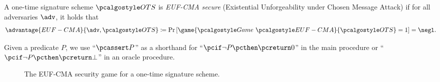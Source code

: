 \begin{definition}\label{def:euf-cma-ot}
    A one-time signature scheme $\algo{OTS}$ is \emph{EUF-CMA secure} (Existential Unforgeability under Chosen Message Attack) if for all \ppt adversaries $\adv$, it holds that
    \[
    \advantage{EUF-CMA}{\adv, \algo{OTS}} \defeq \pr{\game{\Game~\algo{EUF-CMA}}{\algo{OTS}} = 1} = \negl.
    \]
\end{definition}

\begin{remark}
Given a predicate $P$, we use ``$\pcassert P$'' as a shorthand for ``$\pcif \neg P \pcthen \pcreturn 0$'' in the main procedure or ``$\pcif \neg P \pcthen \pcreturn \bot$'' in an oracle procedure.
\end{remark}

\begin{figure}[tbh]
 \begin{tcolorbox}%
  \begin{pchstack}[center]
   \pchspace
  \end{pchstack}
 \end{tcolorbox}
 \caption{The EUF-CMA security game for a one-time signature scheme.}
 \label{fig:euf-cma-ots}
\end{figure}

